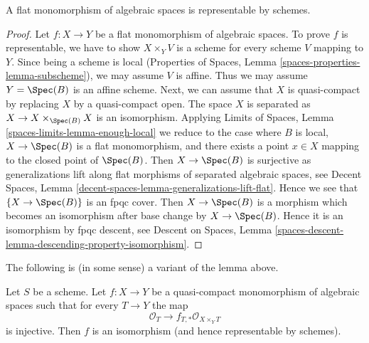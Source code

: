 \begin{lemma}
\label{lemma-flat-case}
A flat monomorphism of algebraic spaces is representable by schemes.
\end{lemma}

\begin{proof}
Let $f : X \to Y$ be a flat monomorphism of algebraic spaces.
To prove $f$ is representable, we have to show
$X \times_Y V$ is a scheme for every scheme $V$ mapping to $Y$.
Since being a scheme is local (Properties of Spaces, 
Lemma \ref{spaces-properties-lemma-subscheme}), we may
assume $V$ is affine. Thus we may assume $Y = \Spec(B)$
is an affine scheme. Next, we can assume that $X$ is quasi-compact
by replacing $X$ by a quasi-compact open. The space $X$ is
separated as $X \to X \times_{\Spec(B)} X$ is an isomorphism.
Applying Limits of Spaces, Lemma \ref{spaces-limits-lemma-enough-local}
we reduce to the case where $B$ is local, $X \to \Spec(B)$ is a
flat monomorphism, and
there exists a point $x \in X$ mapping to the closed point of $\Spec(B)$.
Then $X \to \Spec(B)$ is surjective as generalizations
lift along flat morphisms of separated algebraic spaces, see
Decent Spaces, Lemma \ref{decent-spaces-lemma-generalizations-lift-flat}.
Hence we see that $\{X \to \Spec(B)\}$ is an fpqc cover.
Then $X \to \Spec(B)$ is a morphism which becomes an isomorphism
after base change by $X \to \Spec(B)$. Hence it is an isomorphism by
fpqc descent, see Descent on Spaces, Lemma
\ref{spaces-descent-lemma-descending-property-isomorphism}.
\end{proof}

\noindent
The following is (in some sense) a variant of the lemma above.

\begin{lemma}
\label{lemma-ui-case}
Let $S$ be a scheme. Let $f : X \to Y$ be a quasi-compact monomorphism
of algebraic spaces such that for every $T \to Y$ the map
$$
\mathcal{O}_T \to f_{T,*}\mathcal{O}_{X \times_Y T}
$$
is injective. Then $f$ is an isomorphism (and hence representable by schemes).
\end{lemma}

